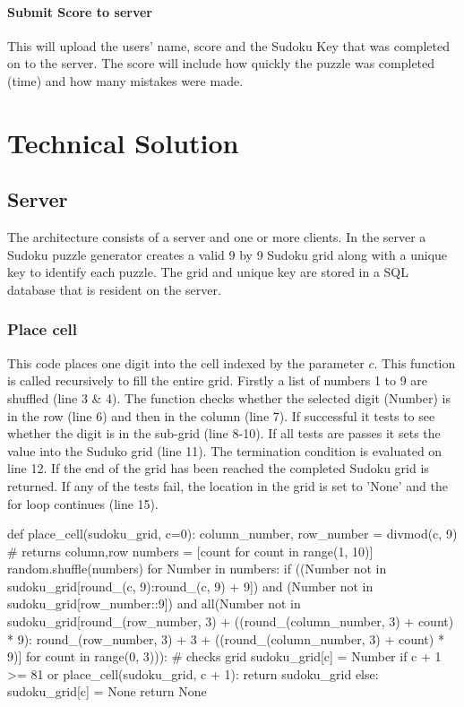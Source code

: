 \documentclass[fleqn]{article}
\begin{document}
\paragraph{Submit Score to server}
This will upload the users’ name, score and the Sudoku Key that was completed on to the server. The score will include how quickly the puzzle was completed (time) and how many mistakes were made.

\newpage
\section{Technical Solution}

\subsection{Server}

The architecture consists of a server and one or more clients. In the server a Sudoku puzzle generator creates a valid 9 by 9 Sudoku grid along with a unique key to identify each puzzle. The grid and unique key are stored in a SQL database that is resident on the server.

\subsubsection{Place cell}
 
This code places one digit into the cell indexed by the parameter $c$. This function is called recursively to fill the entire grid.
Firstly a list of numbers 1 to 9 are shuffled (line 3 \& 4). The function checks whether the selected digit (Number) is in the row (line 6) and then in the column (line 7). If successful it tests to see whether the digit is in the sub-grid (line 8-10). If all tests are passes it sets the value into the Suduko grid (line 11).
The termination condition is evaluated on line 12. If the end of the grid has been reached the completed Sudoku grid is returned.
If any of the tests fail, the location in the grid is set to 'None' and the for loop continues (line 15).


\begin{python}
def place_cell(sudoku_grid, c=0):
    column_number, row_number = divmod(c, 9)  # returns column,row
    numbers = [count for count in range(1, 10)]
    random.shuffle(numbers)
    for Number in numbers:
        if ((Number not in sudoku_grid[round_(c, 9):round_(c, 9) + 9]) and
                (Number not in sudoku_grid[row_number::9]) and
                all(Number not in sudoku_grid[round_(row_number, 3) + ((round_(column_number, 3) + count) * 9):
                    round_(row_number, 3) + 3 + ((round_(column_number, 3) + count) * 9)]
                    for count in range(0, 3))):  # checks grid
            sudoku_grid[c] = Number
            if c + 1 >= 81 or place_cell(sudoku_grid, c + 1):
                return sudoku_grid
    else:
        sudoku_grid[c] = None
        return None
\end{python}
\end{document}
